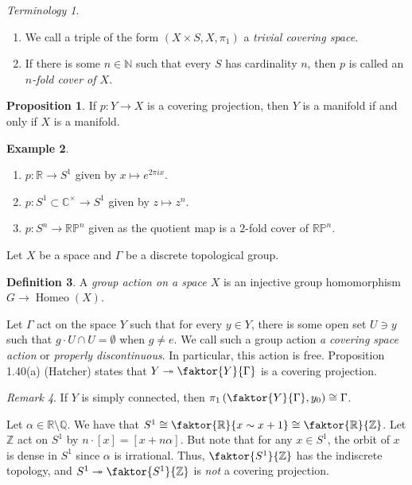 \documentclass[10pt,letterpaper,cm]{nupset}
\theoremstyle{definition}
\newtheorem{definition}{Definition}[subsection]
\newtheorem{exmp}[definition]{Example}
\theoremstyle{theorem}
\newtheorem{prop}[definition]{Proposition}
\theoremstyle{remark}
\newtheorem{remark}[definition]{Remark}
\newtheorem*{term}{Terminology}
\newcommand{\C}{\mathbb C}
\newcommand{\N}{\mathbb N}
\newcommand{\Q}{\mathbb Q}
\newcommand{\R}{\mathbb{R}}
\newcommand{\RP}{\mathbb{RP}}
\newcommand{\Z}{\mathbb Z}
\newcommand{\1}{\mathbb{1}}
\newcommand{\0}{\vec 0}
\DeclareMathOperator{\homeo}{Homeo}
\begin{document}
\begin{term} $ $
\begin{enumerate}
\item 
We call a triple of the form $\left(X \times S, X, \pi_1\right)$ a \textit{trivial covering space}.
\item  If there is some $n\in \N$ such that every $S$ has cardinality $n$, then $p$ is called an \textit{$n$-fold cover of $X$}.
\end{enumerate}
\end{term}

\begin{prop}
If $p: Y \to X$ is a covering projection, then $Y$ is a manifold if and only if $X$ is a manifold. 
\end{prop}

\begin{exmp} $ $
\begin{enumerate}
\item $p : \R \to S^1$ given by $x \mapsto e^{2\pi ix}$.
\item $p: S^1\subset \C^{\times} \to S^1$ given by $z \mapsto z^n$.
\item $p: S^n \to \RP^n$ given as the quotient map is a $2$-fold cover of $\RP^n$.
\end{enumerate}
\end{exmp}

\smallskip

Let $X$ be a space and $\Gamma$ be a discrete topological group. 
\begin{definition}
A \textit{group action on a space $X$} is an injective group homomorphism $G \to \homeo(X)$.
\end{definition}
Let $\Gamma$ act on the space $Y$ such that for every $y\in Y$, there is some open set $U\ni y$ such that $g\cdot U \cap U =\emptyset$ when $g\ne e$. We call such a group action \textit{a covering space action} or \textit{properly discontinuous}. In particular, this action is free.  Proposition 1.40(a) (Hatcher) states that $Y \twoheadrightarrow \faktor{Y}{\Gamma}$ is a covering projection.

\begin{remark}
If $Y$ is simply connected, then $\pi_1 \left(\faktor{Y}{\Gamma} , y_0 \right) \cong \Gamma$.
\end{remark}

Let $\alpha \in \R\setminus \Q$. We have that $S^1 \cong \faktor{\R}{x\sim x+1} \cong \faktor{\R}{\Z}$. Let $\Z$ act on $S^1$ by $n\cdot [x] = [x + n \alpha]$. But note that for any $x\in S^1$, the orbit of $x$ is dense in $S^1$ since $\alpha$ is irrational. Thus, $\faktor{S^1}{\Z}$ has the indiscrete topology, and $S^1 \twoheadrightarrow \faktor{S^1}{\Z}$ is \emph{not} a covering projection.
\end{document}
